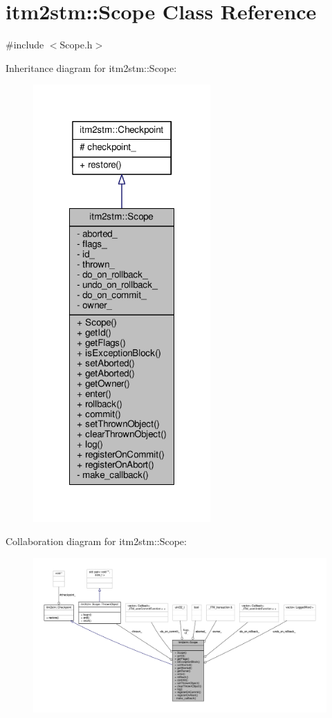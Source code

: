 \hypertarget{classitm2stm_1_1Scope}{\section{itm2stm\-:\-:Scope Class Reference}
\label{classitm2stm_1_1Scope}
}


{\ttfamily \#include $<$Scope.\-h$>$}



Inheritance diagram for itm2stm\-:\-:Scope\-:
\nopagebreak
\begin{figure}[H]
\begin{center}
\leavevmode
\includegraphics[width=192pt]{classitm2stm_1_1Scope__inherit__graph}
\end{center}
\end{figure}


Collaboration diagram for itm2stm\-:\-:Scope\-:
\nopagebreak
\begin{figure}[H]
\begin{center}
\leavevmode
\includegraphics[width=350pt]{classitm2stm_1_1Scope__coll__graph}
\end{center}
\end{figure}
